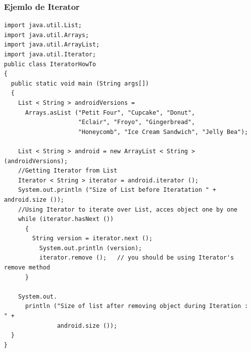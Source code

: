 \documentclass{beamer}
\begin{document}
\begin{frame}[fragile]
\frametitle{Ejemlo de Iterator}
\begin{tiny}
\begin{verbatim}
import java.util.List;
import java.util.Arrays;
import java.util.ArrayList;
import java.util.Iterator;
public class IteratorHowTo
{
  public static void main (String args[])
  {
    List < String > androidVersions =
      Arrays.asList ("Petit Four", "Cupcake", "Donut",
                     "Eclair", "Froyo", "Gingerbread",
                     "Honeycomb", "Ice Cream Sandwich", "Jelly Bea");

    List < String > android = new ArrayList < String > (androidVersions);
    //Getting Iterator from List
    Iterator < String > iterator = android.iterator ();
    System.out.println ("Size of List before Iteratation " + android.size ());
    //Using Iterator to iterate over List, acces object one by one
    while (iterator.hasNext ())
      {
        String version = iterator.next ();
          System.out.println (version);
          iterator.remove ();   // you should be using Iterator's remove method
      }

    System.out.
      println ("Size of list after removing object during Iteration : " +
               android.size ());
  }
}
\end{verbatim}
\end{tiny}
\end{frame}
\end{document}
